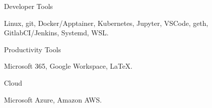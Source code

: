 \documentclass[a4paper,10pt]{article}
\newlength{\cvcolumngapwidth}
\newlength{\cvleftcolumnwidth}
\newlength{\cvrightcolumnwidth}
\newcommand{\cvsectionstyle}[1]{{\normalsize\cvsectionfont\textcolor{cvsectioncolor}{#1}}}
\newcommand{\cvheadingstyle}[1]{{\normalsize\cvheadingfont\textcolor{cvheadingcolor}{#1}}}
\newlength{\cvafteritemskipamount}
\newlength{\cvaftersectionskipamount}
\newlength{\cvbetweensectionandheadingextraskipamount}
\newlength{\cvparskip}
\newcommand{\cvsection}[1]{
    \begin{minipage}[t]{\cvleftcolumnwidth}
        \raggedleft\cvsectionstyle{#1}
    \end{minipage}%
    \hspace{\cvcolumngapwidth}%
    \begin{minipage}[t]{\cvrightcolumnwidth}
        \textcolor{cvrulecolor}{\rule{\cvrightcolumnwidth}{0.3mm}}
    \end{minipage}

    \vspace{\cvaftersectionskipamount}
}
\newcommand{\cvitem}[2]{
    \begin{minipage}[t]{\cvleftcolumnwidth}
        \raggedleft #1
    \end{minipage}%
    \hspace{\cvcolumngapwidth}%
    \begin{minipage}[t]{\cvrightcolumnwidth}
        \setlength{\parskip}{\cvparskip} #2
    \end{minipage}

    \vspace{\cvafteritemskipamount}
}
\begin{document}
\cvitem{
    \cvheadingstyle{Developer Tools}
}{
    Linux, git, Docker/Apptainer, Kubernetes, Jupyter, VSCode, geth, GitlabCI/Jenkins, Systemd, WSL.
}

\cvitem{
    \cvheadingstyle{Productivity Tools}
}{
    Microsoft 365, Google Workspace, \LaTeX.
}

\cvitem{
    \cvheadingstyle{Cloud}
}{
    Microsoft Azure, Amazon AWS.
}




    
    
\end{document}

